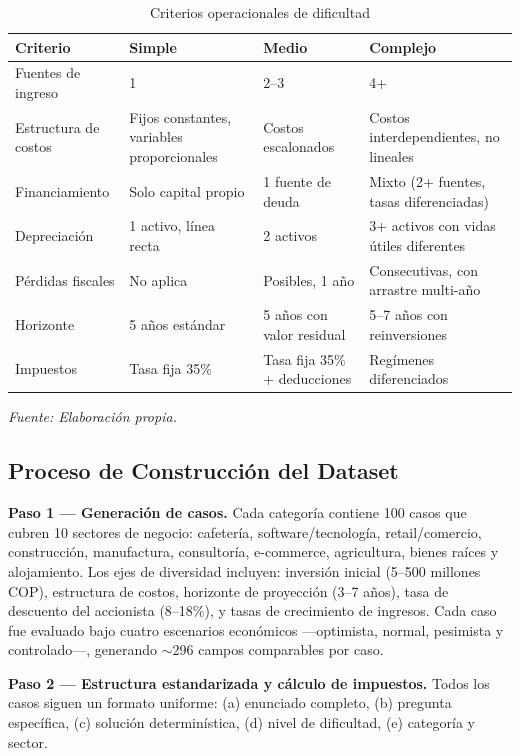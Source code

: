 \documentclass[12pt,a4paper]{article}
\begin{document}
\begin{table}[H]
\centering
\caption{Criterios operacionales de dificultad}
\label{tab:dificultad}
\begin{tabularx}{\textwidth}{lXXX}
\toprule
\textbf{Criterio} & \textbf{Simple} & \textbf{Medio} & \textbf{Complejo} \\
\midrule
Fuentes de ingreso & 1 & 2--3 & 4+ \\
Estructura de costos & Fijos constantes, variables proporcionales & Costos escalonados & Costos interdependientes, no lineales \\
Financiamiento & Solo capital propio & 1 fuente de deuda & Mixto (2+ fuentes, tasas diferenciadas) \\
Depreciación & 1 activo, línea recta & 2 activos & 3+ activos con vidas útiles diferentes \\
Pérdidas fiscales & No aplica & Posibles, 1 año & Consecutivas, con arrastre multi-año \\
Horizonte & 5 años estándar & 5 años con valor residual & 5--7 años con reinversiones \\
Impuestos & Tasa fija 35\% & Tasa fija 35\% + deducciones & Regímenes diferenciados \\
\bottomrule
\end{tabularx}
\smallskip
\footnotesize\textit{Fuente: Elaboración propia.}
\end{table}

\subsection{Proceso de Construcción del Dataset}

\textbf{Paso 1 --- Generación de casos.} Cada categoría contiene 100 casos que cubren 10 sectores de negocio: cafetería, software/tecnología, retail/comercio, construcción, manufactura, consultoría, e-commerce, agricultura, bienes raíces y alojamiento. Los ejes de diversidad incluyen: inversión inicial (5--500 millones COP), estructura de costos, horizonte de proyección (3--7 años), tasa de descuento del accionista (8--18\%), y tasas de crecimiento de ingresos. Cada caso fue evaluado bajo cuatro escenarios económicos ---optimista, normal, pesimista y controlado---, generando $\sim$296 campos comparables por caso.

\textbf{Paso 2 --- Estructura estandarizada y cálculo de impuestos.} Todos los casos siguen un formato uniforme: (a) enunciado completo, (b) pregunta específica, (c) solución determinística, (d) nivel de dificultad, (e) categoría y sector.
\end{document}
